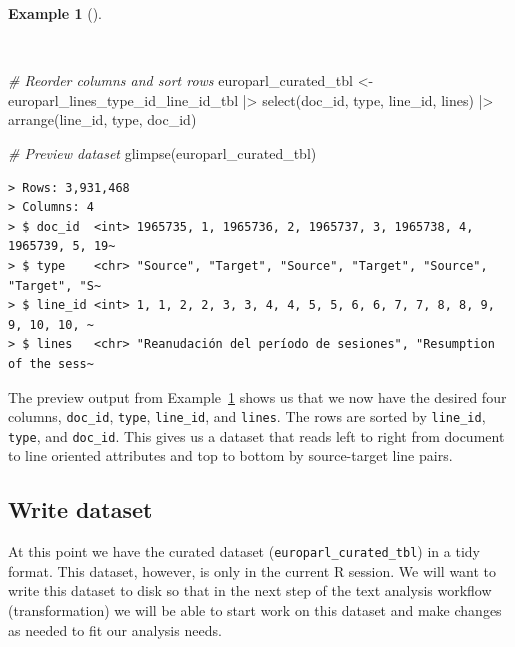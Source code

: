 \documentclass[
  letterpaper,
  DIV=11,
  numbers=noendperiod]{scrreport}
\newenvironment{Shaded}{\begin{snugshade}}{\end{snugshade}}
\newcommand{\CommentTok}[1]{\textcolor[rgb]{0.00,0.00,0.00}{\textit{#1}}}
\newcommand{\FunctionTok}[1]{\textcolor[rgb]{0.00,0.00,0.00}{#1}}
\newcommand{\NormalTok}[1]{\textcolor[rgb]{0.00,0.00,0.00}{#1}}
\newcommand{\OtherTok}[1]{\textcolor[rgb]{0.00,0.00,0.00}{#1}}
\newcommand{\SpecialCharTok}[1]{\textcolor[rgb]{0.00,0.00,0.00}{#1}}
\theoremstyle{definition}
\newtheorem{example}{Example}[chapter]
\theoremstyle{remark}
\begin{document}
\begin{example}[]\protect\hypertarget{exm-cd-europarl-curated-tbl}{}\label{exm-cd-europarl-curated-tbl}

~

\begin{Shaded}
\begin{Highlighting}[]
\CommentTok{\# Reorder columns and sort rows}
\NormalTok{europarl\_curated\_tbl }\OtherTok{\textless{}{-}} 
\NormalTok{  europarl\_lines\_type\_id\_line\_id\_tbl }\SpecialCharTok{|\textgreater{}} 
  \FunctionTok{select}\NormalTok{(doc\_id, type, line\_id, lines) }\SpecialCharTok{|\textgreater{}} 
  \FunctionTok{arrange}\NormalTok{(line\_id, type, doc\_id)}

\CommentTok{\# Preview dataset}
\FunctionTok{glimpse}\NormalTok{(europarl\_curated\_tbl)}
\end{Highlighting}
\end{Shaded}

\begin{verbatim}
> Rows: 3,931,468
> Columns: 4
> $ doc_id  <int> 1965735, 1, 1965736, 2, 1965737, 3, 1965738, 4, 1965739, 5, 19~
> $ type    <chr> "Source", "Target", "Source", "Target", "Source", "Target", "S~
> $ line_id <int> 1, 1, 2, 2, 3, 3, 4, 4, 5, 5, 6, 6, 7, 7, 8, 8, 9, 9, 10, 10, ~
> $ lines   <chr> "Reanudación del período de sesiones", "Resumption of the sess~
\end{verbatim}

\end{example}

The preview output from Example~\ref{exm-cd-europarl-curated-tbl} shows
us that we now have the desired four columns, \texttt{doc\_id},
\texttt{type}, \texttt{line\_id}, and \texttt{lines}. The rows are
sorted by \texttt{line\_id}, \texttt{type}, and \texttt{doc\_id}. This
gives us a dataset that reads left to right from document to line
oriented attributes and top to bottom by source-target line pairs.

\hypertarget{write-dataset}{%
\subsection{Write dataset}\label{write-dataset}}

At this point we have the curated dataset
(\texttt{europarl\_curated\_tbl}) in a tidy format. This dataset,
however, is only in the current R session. We will want to write this
dataset to disk so that in the next step of the text analysis workflow
(transformation) we will be able to start work on this dataset and make
changes as needed to fit our analysis needs.
\end{document}
